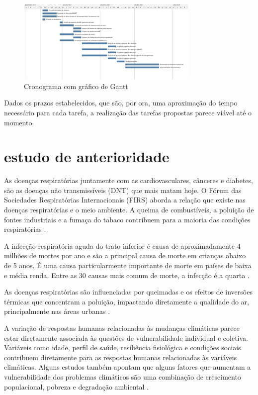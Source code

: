 \documentclass[journal]{IEEEtran}
\begin{document}
\begin{figure}[htpb]
    \centering
    \includegraphics[height=4cm,keepaspectratio=true]{docs/Cronograma.PNG}
    \caption{Cronograma com gráfico de Gantt}
    \label{fig:Gantt}
    \centering
\end{figure}

Dados os prazos estabelecidos, que são, por ora, uma aproximação  do tempo necessário para cada tarefa, a realização das tarefas propostas parece viável até o momento.


\section{estudo de anterioridade} 
As doenças respiratórias juntamente com as cardiovasculares, cânceres e diabetes, são as doenças não transmissíveis (DNT) que mais matam hoje.
O Fórum das Sociedades Respiratórias Internacionais (FIRS) aborda a relação que existe nas doenças respiratórias e o meio ambiente. A queima de combustíveis, a poluição de fontes industriais e a fumaça do tabaco contribuem para a maioria das condições respiratórias \cite{firs}.

A infecção respiratória aguda do trato inferior é causa de aproximadamente 4 milhões de mortes por ano e são a principal causa de morte em crianças abaixo de 5 anos. É uma causa particularmente importante de morte em países de baixa e média renda. Entre as 30 causas mais comum de morte, a infecção é a quarta \cite{firs}.

As  doenças  respiratórias  são influenciadas por queimadas e os efeitos de inversões térmicas que concentram a poluição, impactando diretamente a qualidade do ar, principalmente nas áreas urbanas \cite{mudanças}.

A variação de respostas humanas relacionadas às mudanças  climáticas  parece  estar  diretamente  associada às  questões  de  vulnerabilidade  individual  e  coletiva. Variáveis  como  idade,  perfil  de  saúde,  resiliência  fisiológica e condições sociais contribuem diretamente para  as  respostas  humanas  relacionadas  às  variáveis climáticas.  Alguns  estudos também  apontam  que  alguns  fatores  que  aumentam a  vulnerabilidade  dos  problemas  climáticos  são  uma combinação  de  crescimento  populacional,  pobreza  e degradação  ambiental \cite{mudanças}.
\end{document}
